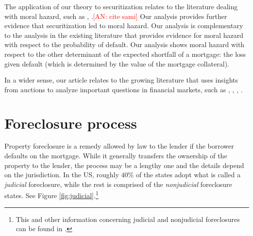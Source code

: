\documentclass[11pt,twopage]{article}
\newcommand{\AN}[1]{\textcolor{red}{[AN: #1]}}
\begin{document}


The application of our theory to securitization relates to the
literature dealing with moral hazard, such as \cite{keys2008did},
\cite{tirole2011illiquidity}.\AN{cite sami} Our analysis provides
further evidence that securitization led to moral hazard. Our analysis
is complementary to the analysis in the existing literature that
provides evidence for moral hazard with respect to the probability of
default. Our analysis shows moral hazard with respect to the other
determinant of the expected shortfall of a mortgage: the loss given
default (which is determined by the value of the mortgage collateral).

In a wider sense, our article relates to the growing literature that
uses insights from auctions to analyze important questions in
financial markets, such as \cite{heller1998auctions},
\cite{hortacsu2010mechanism}, \cite{cassola20132007},
\cite{zulehner2013competition}.


\section{Foreclosure process}
Property foreclosure is a remedy allowed by law to the lender if the
borrower defaults on the mortgage. While it generally transfers the
ownership of the property to the lender, the process may be a lengthy
one and the details depend on the jurisdiction. In the US, roughly
$40\%$ of the states adopt what is called a \emph{judicial}
foreclosure, while the rest is comprised of the \emph{nonjudicial}
foreclosure states. See Figure \ref{fig:judicial}.\footnote{This and
  other information concerning judicial and nonjudicial foreclosures
  can be found in \cite{nelson2004reforming}.}
\end{document}
